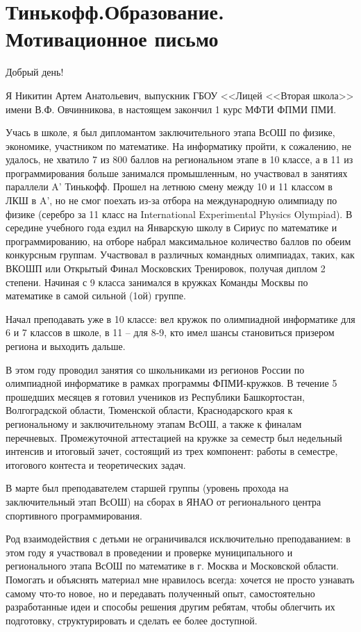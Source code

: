 \section{\textbf{Тинькофф.Образование. Мотивационное письмо}}
\smallskip

\quad Добрый день!
\smallskip

\quad Я Никитин Артем Анатольевич, выпускник ГБОУ <<Лицей <<Вторая школа>> имени В.Ф. Овчинникова, в настоящем закончил 1 курс МФТИ ФПМИ ПМИ.

\quad Учась в школе, я был дипломантом заключительного этапа ВсОШ по физике, экономике, участником по математике. На информатику пройти, к
сожалению, не удалось, не хватило 7 из 800 баллов на региональном этапе в 10 классе, а в 11 из программирования больше занимался промышленным,
но участвовал в занятиях параллели A' Тинькофф. Прошел на летнюю смену между 10 и 11 классом в ЛКШ в A', но не смог поехать из-за отбора на
международную олимпиаду по физике (серебро за 11 класс на International Experimental Physics Olympiad). В середине учебного года ездил на
Январскую школу в Сириус по математике и программированию, на отборе набрал максимальное количество баллов по обеим конкурсным группам.
Участвовал в различных командных олимпиадах, таких, как ВКОШП или Открытый Финал Московских Тренировок, получая диплом 2 степени. Начиная с 9
класса занимался в кружках Команды Москвы по математике в самой сильной (1ой) группе.

\quad Начал преподавать уже в 10 классе: вел кружок по олимпиадной информатике для 6 и 7 классов в школе, в 11 – для 8-9, кто имел шансы
становиться призером региона и выходить дальше.

\quad В этом году проводил занятия со школьниками из регионов России по олимпиадной информатике в рамках программы ФПМИ-кружков. В течение 5
прошедших месяцев я готовил учеников из Республики Башкортостан, Волгоградской области, Тюменской области, Краснодарского края к региональному
и заключительному этапам ВсОШ, а также к финалам перечневых. Промежуточной аттестацией на кружке за семестр был недельный интенсив и итоговый 
зачет, состоящий из трех компонент: работы в семестре, итогового контеста и теоретических задач.

\quad В марте был преподавателем старшей группы (уровень прохода на заключительный этап ВсОШ) на сборах в ЯНАО от регионального центра 
спортивного программирования.

\quad Род взаимодействия с детьми не ограничивался исключительно преподаванием: в этом году я участвовал в проведении и проверке муниципального 
и регионального этапа ВсОШ по математике в г. Москва и Московской области. Помогать и объяснять материал мне нравилось всегда: хочется не 
просто узнавать самому что-то новое, но и передавать полученный опыт, самостоятельно разработанные идеи и способы решения другим ребятам, чтобы 
облегчить их подготовку, структурировать и сделать ее более доступной.

